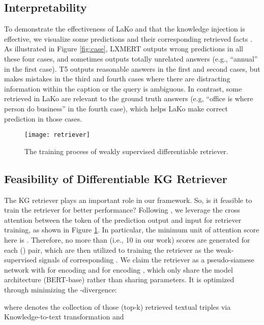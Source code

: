 \documentclass[sigconf]{acmart}
\newcommand{\cjy}[1]{{\color{black}#1}}
\begin{document}
 \vspace{-1mm}
\subsection{Interpretability}\label{fig:interpretability}
\cjy{To demonstrate the effectiveness of LaKo and that the knowledge injection is effective,
we visualize some predictions and their corresponding retrieved facts .
As illustrated in Figure \ref{fig:case}, LXMERT  outputs wrong predictions in all these four cases, and sometimes outputs totally unrelated answers (e.g., ``annual'' in the first case).
T5 outputs reasonable answers in the first and second cases, but makes mistakes in the third and fourth cases where there are distracting information within the caption or the query is ambiguous.
In contrast, some retrieved  in LaKo are relevant to the ground truth answers (e.g, ``office is where person do business'' in the fourth case), which helps LaKo make correct prediction in those cases.
}
\begin{figure}[htbp]
\texttt{[image: retriever]}
    \caption{The training process of weakly supervised differentiable retriever.
    } 
  \label{fig:retriever}
  \vspace{-2mm}
\end{figure}

\subsection{Feasibility of Differentiable KG Retriever}\label{sec:differentiable_retriever}
\cjy{The KG retriever} plays an important role in our framework. So, \cjy{is it feasible to train the retriever for better performance?}
Following \citep{DBLP:conf/iclr/IzacardG21}, we leverage the cross attention between the token of the prediction output and input  for retriever training, as shown in Figure \ref{fig:retriever}. 
In particular, the minimum unit of attention score here is . Therefore, no more than  (i.e., 10 in our work) scores are generated for each () pair, which are then utilized to training the retriever as the weak-supervised signals of corresponding . 
We claim the retriever as a pseudo-siamese network \cite{DBLP:conf/cvpr/ChenH21} with  for encoding  and   for encoding , which only share the model architecture (BERT-base) rather than sharing parameters.
It is optimized through minimizing the -divergence:

where  denotes the collection of those (top-k) retrieved textual triples  via Knowledge-to-text transformation and 
\end{document}
